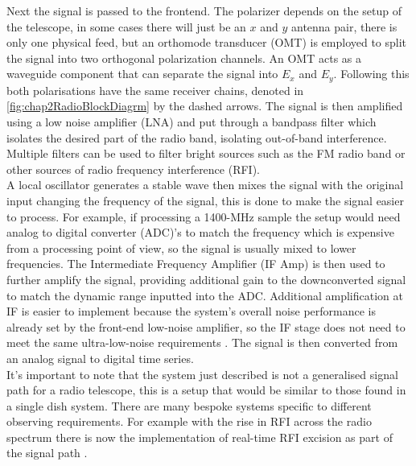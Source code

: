 Next the signal is passed to the frontend. The polarizer depends on the setup of the telescope, in some cases there will just be an $x$ and $y$ antenna pair, there is only one physical feed, but an orthomode transducer (OMT) is employed to split the signal into two orthogonal polarization channels. An OMT acts as a waveguide component that can separate the signal into $E_x$ and $E_y$. Following this both polarisations have the same receiver chains, denoted in \cref{fig:chap2RadioBlockDiagrm} by the dashed arrows. The signal is then amplified using a low noise amplifier (LNA) and put through a bandpass filter which isolates the desired part of the radio band, isolating out-of-band interference. Multiple filters can be used to filter bright sources such as the FM radio band or other sources of radio frequency interference (RFI). \\

A local oscillator generates a stable wave then mixes the signal with the original input changing the frequency of the signal, this is done to make the signal easier to process. For example, if processing a 1400-MHz sample the setup would need analog to digital converter (ADC)'s to match the frequency which is expensive from a processing point of view, so the signal is usually mixed to lower frequencies. The Intermediate Frequency Amplifier (IF Amp) is then used to further amplify the signal, providing additional gain to the downconverted signal to match the dynamic range inputted into the ADC. Additional amplification at IF is easier to implement because the system’s overall noise performance is already set by the front-end low-noise amplifier, so the IF stage does not need to meet the same ultra-low-noise requirements \citep{warnick_generalized_2024}. The signal is then converted from an analog signal to digital time series. \\ 
It's important to note that the system just described is not a generalised signal path for a radio telescope, this is a setup that would be similar to those found in a single dish system. There are many bespoke systems specific to different observing requirements. For example with the rise in RFI across the radio spectrum there is now the implementation of real-time RFI excision as part of the signal path \citep{buch_real-time_2025}. 

